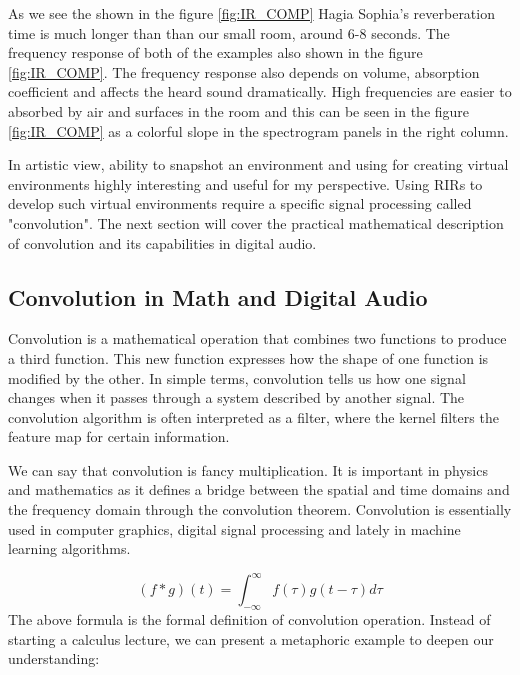             As we see the shown in the figure \ref{fig:IR_COMP} Hagia Sophia's reverberation time is much longer than than our small room, around 6-8 seconds. The frequency response of both of the examples also shown in the figure \ref{fig:IR_COMP}. The frequency response also depends on volume, absorption coefficient and affects the heard sound dramatically. High frequencies are easier to absorbed by air and surfaces\cite{Room_Acoustics} in the room and this can be seen in the figure \ref{fig:IR_COMP} as a colorful slope in the spectrogram panels in the right column.\par

            In artistic view, ability to snapshot an environment and using for creating virtual environments\cite{Recreation_of_the_Acoustics_of_Hagia_Sophia} highly interesting and useful for my perspective. Using RIRs to develop such virtual environments require a specific signal processing called "convolution". The next section will cover the practical mathematical description of convolution and its capabilities in digital audio.            
        \subsection{Convolution in Math and Digital Audio}
            Convolution is a mathematical operation that combines two functions to produce a third function. This new function expresses how the shape of one function is modified by the other. In simple terms, convolution tells us how one signal changes when it passes through a system described by another signal. The convolution algorithm is often interpreted as a filter, where the kernel filters the feature map for certain information\cite{Deep_Learning_Core_Concepts}.\par

            We can say that convolution is fancy multiplication\cite{Guide_to_Convolution}. It is important in physics and mathematics as it defines a bridge between the spatial and time domains and the frequency domain through the convolution theorem. Convolution is essentially used in computer graphics, digital signal processing and lately in machine learning algorithms.\par
            $$(f \ast g)(t)=\int_{-\infty}^{\infty} f(\tau) g(t-\tau) d \tau$$
            The above formula is the formal definition of convolution operation. Instead of starting a calculus lecture, we can present a metaphoric example to deepen our understanding:\par

